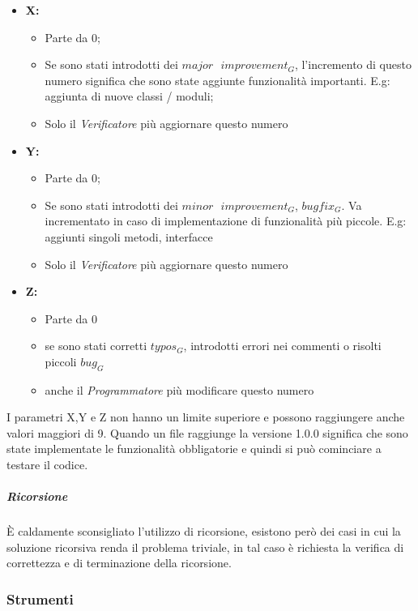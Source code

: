 			\begin{itemize}
				\item \textbf{X:} 
					\begin{itemize}
						\item Parte da 0;
						\item Se sono stati introdotti dei $major\text{ }improvement_G$, l'incremento di questo numero significa che sono state aggiunte funzionalità importanti. E.g: aggiunta di nuove classi / moduli;
						\item Solo il \emph{Verificatore} più aggiornare questo numero
					\end{itemize}
				
				\item \textbf{Y:} 
					\begin{itemize}
						\item Parte da 0;
						\item Se sono stati introdotti dei $minor\text{ }improvement_G$, $bugfix_G$. Va incrementato in caso di implementazione di funzionalità più piccole. E.g: aggiunti singoli metodi, interfacce
						\item Solo il \emph{Verificatore} più aggiornare questo numero
					\end{itemize}

				\item \textbf{Z:}
					\begin{itemize}
						\item Parte da 0
						\item se sono stati corretti $typos_G$, introdotti errori nei commenti o risolti piccoli $bug_G$
						\item anche il \emph{Programmatore} più modificare questo numero
					\end{itemize}
			\end{itemize}
			I parametri X,Y e Z non hanno un limite superiore e possono raggiungere anche valori maggiori di 9.
			Quando un file raggiunge la versione 1.0.0 significa che sono state implementate le funzionalità obbligatorie e quindi si può cominciare a testare il codice.
			\subparagraph{Ricorsione} \Spazio
			È caldamente sconsigliato l'utilizzo di ricorsione, esistono però dei casi in cui la soluzione ricorsiva renda il problema triviale, in tal caso è richiesta la verifica di correttezza e di terminazione della ricorsione.
			
	\subsubsection{Strumenti}
